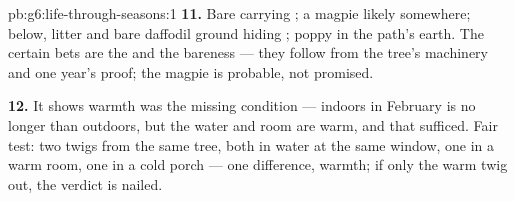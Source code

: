 \begin{solution}{pb:g6:life-through-seasons:1}
\textbf{11.} Bare  carrying ; a magpie likely
somewhere; below,  litter and bare daffodil ground
hiding ; poppy  in the path's earth. The certain
bets are the  and the bareness --- they follow from the
tree's  machinery and one year's proof; the magpie
is probable, not promised.

\textbf{12.} It shows warmth was the missing condition ---
 indoors in February is no longer than outdoors, but
the water and room are warm, and that sufficed. Fair test:
two twigs from the same tree, both in water at the same
window, one in a warm room, one in a cold porch --- one
difference, warmth; if only the warm twig  out, the
verdict is nailed.
\end{solution}
